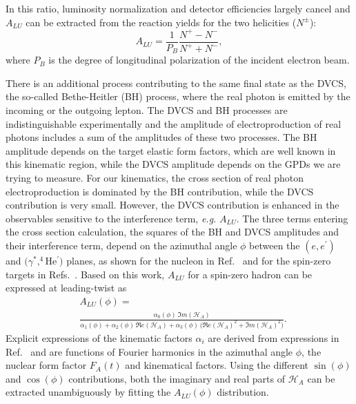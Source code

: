 \documentclass[twocolumn,nofootinbib,showpacs,prl,superscriptaddress,secnumarabic,amssymb,nobibnotes,aps,floatfix]{revtex4}
\begin{document}
In this ratio, luminosity normalization and
detector efficiencies largely cancel and $A_{LU}$ can be 
extracted from the reaction yields for the two helicities ($N^{\pm}$):
\begin{equation}
A_{LU} = \frac{1}{P_{B}} \frac{N^{+} - N^{-}}{N^{+} + N^{-} },
\end{equation}
where $P_{B}$ is the degree of longitudinal polarization of the incident electron beam.

There is an additional process contributing to the same final state as the 
DVCS, the so-called Bethe-Heitler (BH) process, where the real photon is 
emitted by the incoming or the outgoing lepton. The DVCS and BH processes are 
indistinguishable experimentally and the amplitude of electroproduction of real
photons includes a sum of the amplitudes of these two processes. The BH 
amplitude depends on the target elastic form factors, which are well known in this
kinematic region, while the DVCS amplitude depends on the GPDs we are trying to
measure. For our kinematics, the cross section of real photon 
electroproduction is dominated by the BH contribution, while the DVCS 
contribution is very small. However, the DVCS contribution is
enhanced in the observables sensitive to the interference term, {\it e.g.} 
$A_{LU}$. The three terms entering the cross section calculation,
the squares of the BH and DVCS amplitudes and their interference term, depend on the
azimuthal angle $\phi$ between the $(e,e^\prime)$ and $(\gamma^*,^4$He$^\prime)$ planes,
as shown for the nucleon in Ref.~\cite{Belitsky:2001ns} and for the spin-zero targets
in Refs.~\cite{Kirchner:2003wt,Belitsky:2008bz}. Based on this work, $A_{LU}$ 
for a spin-zero hadron can be expressed at leading-twist as
\begin{equation}
\begin{split}
&A_{LU}(\phi) = \\
&\frac{\alpha_{0}(\phi) \, \Im m(\mathcal{H}_{A})}
{\alpha_{1}(\phi) + \alpha_{2}(\phi) \, \Re e(\mathcal{H}_{A}) + \alpha_{3}(\phi) \, 
\big( \Re e(\mathcal{H}_{A})^{2} + \Im m(\mathcal{H}_{A})^{2} \big)}.
\end{split}
\label{eq:A_LU-coh}
\end{equation}
Explicit expressions of the kinematic factors $\alpha_i$ are derived 
from expressions in
Ref.~\cite{Belitsky:2008bz} and are functions of Fourier harmonics in the 
azimuthal angle $\phi$, the nuclear form factor $F_A(t)$ and kinematical
factors. Using the different $\sin(\phi)$ and $\cos(\phi)$ contributions, 
both the imaginary and real parts of $\mathcal{H}_{A}$ can be extracted unambiguously
by fitting the $A_{LU}(\phi)$ distribution.
\end{document}
